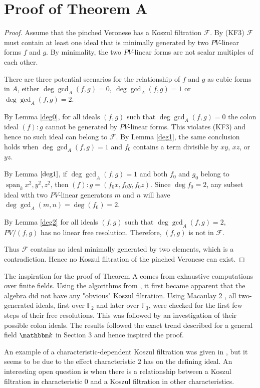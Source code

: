 \section*{Proof of Theorem A}
\begin{proof}
    Assume that the pinched Veronese has a Koszul filtration $\mathcal{F}$.
    By (KF3) $\mathcal{F}$ must contain at least one ideal that is minimally generated by two $PV$-linear forms $f$ and $g$. By minimality, the two $PV$-linear forms are not scalar multiples of each other. 

    There are three potential scenarios for the relationship of $f$ and $g$ as cubic forms in $A$, either $\deg\gcd_A(f,g)=0,\:\deg\gcd_A(f,g)=1$ or $\deg\gcd_A(f,g)=2$.
    
     By Lemma \ref{deg0}, for all ideals $(f,g)$ such that $\deg\gcd_A(f,g)=0$ the colon ideal $(f):g$ cannot be generated by $PV$-linear forms. This violates (KF3) and hence no such ideal can belong to $\mathcal{F}$. By Lemma \ref{deg1}, the same conclusion holds when $\deg\gcd_A(f,g)=1$ and $f_0$ contains a term divisible by $xy$, $xz$, or $yz$.
     
      By Lemma $\ref{deg1}$, if $\deg\gcd_A(f,g)=1$ and both $f_0$ and $g_0$ belong to $\operatorname{span}_k{x^2,y^2,z^2}$, then $(f):g=(f_0x,f_0y,f_0z)$. Since $\deg f_0=2$, any subset ideal with two $PV$-linear generators $m$ and $n$ will have $\deg\gcd_A(m,n)=\deg(f_0)=2$.      
      
      By Lemma \ref{deg2} for all ideals $(f,g)$ such that $\deg\gcd_A(f,g)=2$, $PV/(f,g)$ has no linear free resolution. Therefore, $(f,g)$ is not in $\mathcal{F}$. 
      
      Thus $\mathcal{F}$ contains no ideal minimally generated by two elements, which is a contradiction. Hence no Koszul filtration of the pinched Veronese can exist.

\end{proof}

\noindent
The inspiration for the proof of Theorem A comes from exhaustive computations over finite fields. Using the algorithms from \cite{berghofer2026con}, it first became apparent that the algebra did not have any "obvious" Koszul filtration. Using Macaulay 2 \cite{M2}, all two-generated ideals, first over $\mathbb{F}_2$ and later over $\mathbb{F}_3$, were checked for the first few steps of their free resolutions. This was followed by an investigation of their possible colon ideals. The results followed the exact trend described for a general field $\K$ in Section 3 and hence inspired the proof. 

An example of a characteristic-dependent Koszul filtration was given in \cite{berghofer2026con}, but it seems to be due to the effect characteristic $2$ has on the defining ideal. An interesting open question is when there is a relationship between a Koszul filtration in characteristic $0$ and a Koszul filtration in other characteristics.
